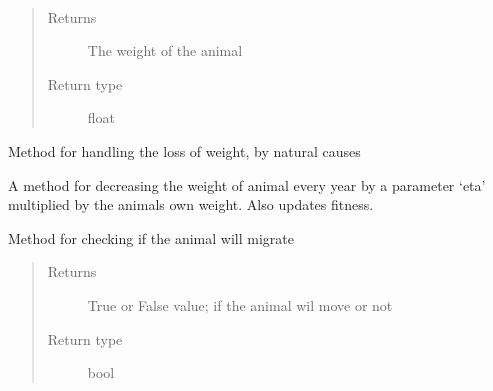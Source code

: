 \documentclass[a4paper,10pt,english]{sphinxmanual}
\begin{document}
\begin{fulllineitems}
\begin{fulllineitems}
\begin{quote}
\begin{description}
\end{description}\end{quote}

\end{fulllineitems}


\begin{fulllineitems}
\label{\detokenize{animals:biosim.animals.Herbivore.get_weight}}~\begin{quote}\begin{description}
\item[{Returns}] \leavevmode
The weight of the animal

\item[{Return type}] \leavevmode
float

\end{description}\end{quote}

\end{fulllineitems}


\begin{fulllineitems}
\label{\detokenize{animals:biosim.animals.Herbivore.loss_of_weight}}
Method for handling the loss of weight, by natural causes

A method for decreasing the weight of animal every year by a parameter
`eta' multiplied by the animals own weight. Also updates fitness.

\end{fulllineitems}


\begin{fulllineitems}
\label{\detokenize{animals:biosim.animals.Herbivore.migration}}
Method for checking if the animal will migrate
\begin{quote}\begin{description}
\item[{Returns}] \leavevmode
True or False value; if the animal wil move or not

\item[{Return type}] \leavevmode
bool

\end{description}\end{quote}


\end{fulllineitems}
\end{fulllineitems}
\end{document}
